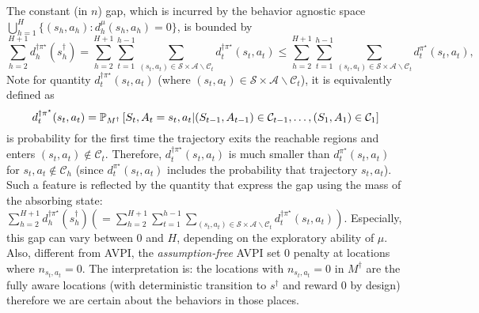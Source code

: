 The constant (in $n$) gap, which is incurred by the behavior agnostic space $\bigcup_{h=1}^H \{(s_h,a_h): d^\mu_h(s_h,a_h)=0\}$, is bounded by 
\[
\sum_{h=2}^{H+1}d^{\dagger\pi^\star}_h(s^\dagger_h)=\sum_{h=2}^{H+1}\sum_{t=1}^{h-1}\sum_{(s_t,a_t)\in\mathcal{S}\times\mathcal{A}\backslash\mathcal{C}_t}d^{\dagger\pi^\star}_t(s_t,a_t)\leq \sum_{h=2}^{H+1}\sum_{t=1}^{h-1}\sum_{(s_t,a_t)\in\mathcal{S}\times\mathcal{A}\backslash\mathcal{C}_t}d^{\pi^\star}_t(s_t,a_t),
\]
Note for quantity $d^{\dagger\pi^\star}_t(s_t,a_t)$ (where $(s_t,a_t)\in\mathcal{S}\times\mathcal{A}\backslash \mathcal{C}_t$), it is equivalently defined as 
\[
d^{\dagger\pi^\star}_t(s_t,a_t)=\P_{M^\dagger}\left[ S_t,A_t=s_t,a_t\middle| (S_{t-1},A_{t-1})\in\mathcal{C}_{t-1},\ldots,(S_{1},A_{1})\in\mathcal{C}_{1} \right]
\]
is probability for the first time the trajectory exits the reachable regions and enters $(s_t,a_t)\notin\mathcal{C}_t$. Therefore, $d^{\dagger\pi^\star}_t(s_t,a_t)$ is much smaller than $d^{\pi^\star}_t(s_t,a_t)$ for $s_t,a_t\notin\mathcal{C}_h$ (since $d^{\pi^\star}_t(s_t,a_t)$ includes the probability that trajectory $s_t,a_t$). Such a feature is reflected by the quantity that express the gap using the mass of the absorbing state: $\sum_{h=2}^{H+1}d^{\dagger\pi^\star}_h(s^\dagger_h)(=\sum_{h=2}^{H+1}\sum_{t=1}^{h-1}\sum_{(s_t,a_t)\in\mathcal{S}\times\mathcal{A}\backslash\mathcal{C}_t}d^{\dagger\pi^\star}_t(s_t,a_t))$. Especially, this gap can vary between $0$ and $H$, depending on the exploratory ability of $\mu$. Also, different from AVPI, the \emph{assumption-free} AVPI set $0$ penalty at locations where $n_{s_t,a_t}=0$. The interpretation is: the locations with $n_{s_t,a_t}=0$ in $M^\dagger$ are the fully aware locations (with deterministic transition to $s^\dagger$ and reward $0$ by design) therefore we are certain about the behaviors in those places.

